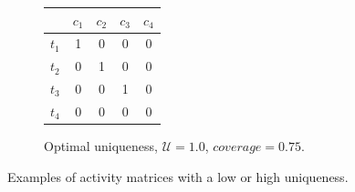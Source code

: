 \documentclass[twoside,a4paper,11pt]{memoir}
\begin{document}
\begin{figure}
\begin{subfigure}[b]{0.49\linewidth}
    \end{subfigure}
    \hfill
    \begin{subfigure}[b]{0.49\linewidth}
        \centering
        \begin{tabular}{c|cccc}
          & \(c_1 \) & \(c_2 \) & \(c_3 \) & \(c_4 \)     \\ \hline
          \(t_1 \) & 1 & 0 & 0 & 0 \\
          \(t_2 \) & 0 & 1 & 0 & 0 \\
          \(t_3 \) & 0 & 0 & 1 & 0 \\
          \(t_4 \) & 0 & 0 & 0 & 0 \\
        \end{tabular}
        \caption{Optimal uniqueness, \(\mathcal{U}=1.0 \), \(coverage = 0.75 \).}%
        \label{subfig:optimal_uniqueness}
    \end{subfigure}
    \caption{Examples of activity matrices with a low or high uniqueness.}
\end{figure}
\end{document}
